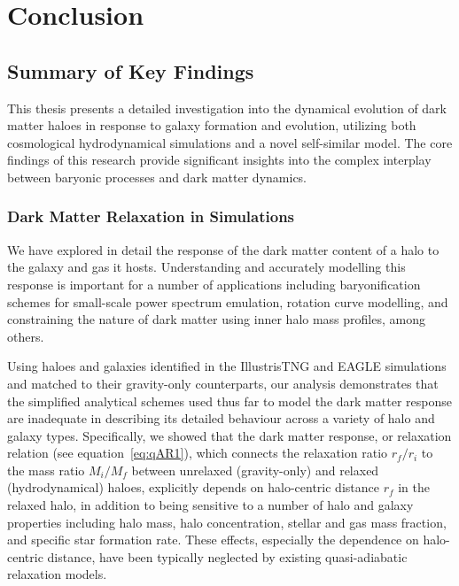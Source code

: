 \chapter{Conclusion}
\label{chap:conclusion}

\section{Summary of Key Findings}

This thesis presents a detailed investigation into the dynamical evolution of dark matter haloes in response to galaxy formation and evolution, utilizing both cosmological hydrodynamical simulations and a novel self-similar model. The core findings of this research provide significant insights into the complex interplay between baryonic processes and dark matter dynamics.

\subsection{Dark Matter Relaxation in Simulations}
We have explored in detail the response of the dark matter content of a halo to the galaxy and gas it hosts. Understanding and accurately modelling this response is important for a number of applications including baryonification schemes for small-scale power spectrum emulation, rotation curve modelling, and constraining the nature of dark matter using inner halo mass profiles, among others.

Using haloes and galaxies identified in the IllustrisTNG and EAGLE simulations and matched to their gravity-only counterparts, our analysis demonstrates that the simplified analytical schemes used thus far to model the dark matter response \citep[e.g.,][]{1986ApJ...301...27B,2010MNRAS.407..435A,2015JCAP...12..049S} are inadequate in describing its detailed behaviour across a variety of halo and galaxy types. Specifically, we showed that the dark matter response, or relaxation relation (see equation~\ref{eq:qAR1}), which connects the relaxation ratio $r_f/r_i$ to the mass ratio $M_i/M_f$ between unrelaxed (gravity-only) and relaxed (hydrodynamical) haloes, explicitly depends on halo-centric distance $r_f$ in the relaxed halo, in addition to being sensitive to a number of halo and galaxy properties including halo mass, halo concentration, stellar and gas mass fraction, and specific star formation rate. These effects, especially the dependence on halo-centric distance, have been typically neglected by existing quasi-adiabatic relaxation models.

